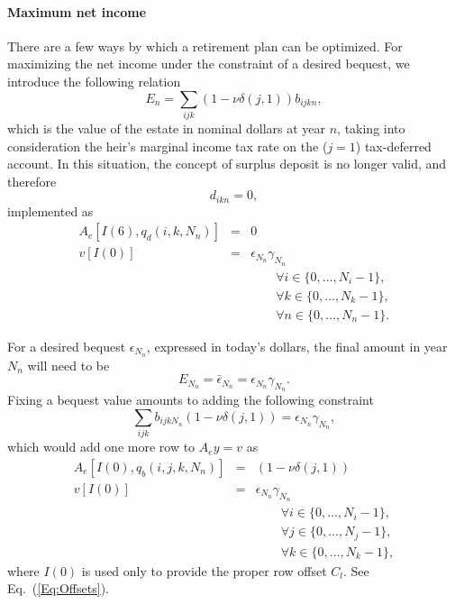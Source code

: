 \documentclass{article}[fleqn,12pt]
\begin{document}
\paragraph*{Maximum net income}
There are a few ways by which a retirement plan can be optimized. For maximizing the net income under
the constraint of a desired bequest, we introduce the following relation
\begin{equation}
	\label{Eq:Bequest}
	E_n = \sum_{ijk} (1 - \nu\delta(j, 1)) b_{ijkn},
\end{equation}
which is the value of the estate in nominal dollars at year $n$,
taking into consideration the heir's marginal income tax rate on the ($j=1$) tax-deferred account. 
In this situation, the concept of surplus deposit is no longer valid, and therefore
\begin{equation}
	d_{ikn} = 0,
\end{equation}
implemented as
\begin{eqnarray}
	A_e[I(6), q_d(i, k, N_n)] &=& 0 \nonumber \\
	v[I(0)] &=& \epsilon_{N_n}\gamma_{N_n} \\
	&&\qquad\forall i \in \{0,\ldots, N_i-1\},\nonumber\\
	&&\qquad\forall k \in \{0,\ldots, N_k-1\},\nonumber\\
	&&\qquad\forall n \in \{0,\ldots, N_n-1\}.\nonumber
\end{eqnarray}

For a desired bequest $\epsilon_{N_n}$, expressed in today's
dollars, the final amount in year $N_n$ will need to be
\begin{equation}
	E_{N_n} = \bar\epsilon_{N_n} = \epsilon_{N_n} \gamma_{N_n}.
\end{equation}
Fixing a bequest value amounts to adding the following constraint
\begin{equation}
	\sum_{ijk} b_{ijkN_n} (1 - \nu\delta(j, 1)) = \epsilon_{N_n} \gamma_{N_n},
\end{equation}
which would add one more row to $A_ey = v$ as
\begin{eqnarray}
	A_e[I(0), q_b(i, j, k, N_n)] &=& (1 - \nu\delta(j, 1)) \nonumber \\
	v[I(0)] &=& \epsilon_{N_n}\gamma_{N_n} \\
	&&\qquad\forall i \in \{0,\ldots, N_i-1\},\nonumber\\
	&&\qquad\forall j \in \{0,\ldots, N_j-1\},\nonumber\\
	&&\qquad\forall k \in \{0,\ldots, N_k-1\},\nonumber
\end{eqnarray}
where $I(0)$ is used only to provide the proper row offset $C_l$. See Eq.~(\ref{Eq:Offsets}).
\end{document}
